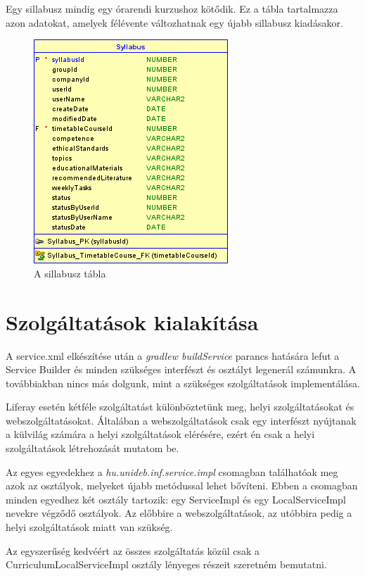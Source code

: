 \documentclass[hidelinks, 12pt, a4paper]{report}
\begin{document}
Egy sillabusz mindig egy órarendi kurzushoz kötődik. Ez a tábla tartalmazza azon adatokat, amelyek félévente változhatnak egy újabb sillabusz kiadásakor.

\begin{figure}[H]
    \centering
	\includegraphics{syllabus.png}
	\caption{A sillabusz tábla}
\end{figure}

\section{Szolgáltatások kialakítása}

A service.xml elkészítése után a \emph{gradlew buildService} parancs hatására lefut a Service Builder és minden szükséges interfészt és osztályt legenerál számunkra. A továbbiakban nincs más dolgunk, mint a szükséges szolgáltatások implementálása.

Liferay esetén kétféle szolgáltatást különböztetünk meg, helyi szolgáltatásokat és webszolgáltatásokat. Általában a webszolgáltatások csak egy interfészt nyújtanak a külvilág számára a helyi szolgáltatások elérésére, ezért én csak a helyi szolgáltatások létrehozását mutatom be.

Az egyes egyedekhez a \emph{hu.unideb.inf.service.impl} csomagban találhatóak meg azok az osztályok, melyeket újabb metódussal lehet bővíteni. Ebben a csomagban minden egyedhez két osztály tartozik: egy ServiceImpl és egy LocalServiceImpl nevekre végződő osztályok. Az előbbire a webszolgáltatások, az utóbbira pedig a helyi szolgáltatások miatt van szükség.

Az egyszerűség kedvéért az összes szolgáltatás közül csak a CurriculumLocalServiceImpl osztály lényeges részeit szeretném bemutatni.
\end{document}

